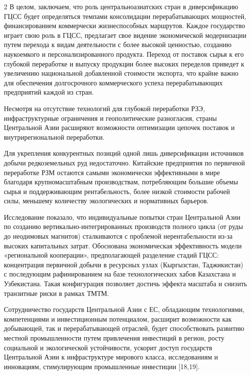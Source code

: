 \begin{multicols}{2}
В целом, заключаем, что роль центральноазиатских стран в диверсификацию
ГЦСС будет определяться темпами консолидации перерабатывающих мощностей,
финансированием коммерчески жизнеспособных маршрутов. Каждое государство
играет свою роль в ГЦСС, предлагает свое видение экономической
модернизации путем перехода к видам деятельности с более высокой
ценностью, созданию наукоемкого и персонализированного продукта. Переход
от поставок сырья к его глубокой переработке и выпуску продукции более
высоких переделов приведет к увеличению национальной добавленной
стоимости экспорта, что крайне важно для обеспечения долгосрочного
коммерческого успеха перерабатывающих предприятий каждой из стран.

Несмотря на отсутствие технологий для глубокой переработки РЗЭ\emph{,}
инфраструктурные ограничения и геополитические разногласия, страны
Центральной Азии расширяют возможности оптимизации цепочек поставок и
внутрирегиональной переработки.

Для укрепления конкурентных позиций одной лишь диверсификации источников
добычи редкоземельных руд недостаточно. Китайские предприятия по
первичной переработке РЗМ остаются самыми экономически эффективными в
мире благодаря крупномасштабным производствам, потребляющим большие
объемы сырья и поддерживающим рентабельность, более низкой стоимости
рабочей силы, меньшему количеству экологических и нормативных барьеров.

Исследование показало, что индивидуальные попытки стран Центральной Азии
по созданию вертикально-интегрированных производств полного цикла (от
руды до неодимовых магнитов) сталкиваются с проблемой нерентабельности
из-за высоких капитальных затрат. Обоснована экономическая эффективность
модели «региональной кооперации», предполагающей разделение стадий ГЦСС:
концентрация первичной добычи в ресурсных узлах (Кыргызстан,
Таджикистан) с последующим рафинированием на базе технологических хабов
Казахстана и Узбекистана. Такая конфигурация позволяет достичь эффекта
масштаба и снизить транзитные риски в рамках ТМТМ.

Сотрудничество государств Центральной Азии с ЕС, обладающим
технологиями, компетенциями и инвестиционным потенциалом, расширит
возможности как добывающей, так и перерабатывающей отраслей, будет
способствовать развитию местной промышленности путем привлечения
инвестиций в регион, росту социальной и экологической устойчивости,
ускорит доступ государств Центральной Азии к инфраструктуре мирового
класса, исследованиям и инновациям, стимулирующим промышленные
инвестиции {[}18,19{]}.


\end{multicols}
